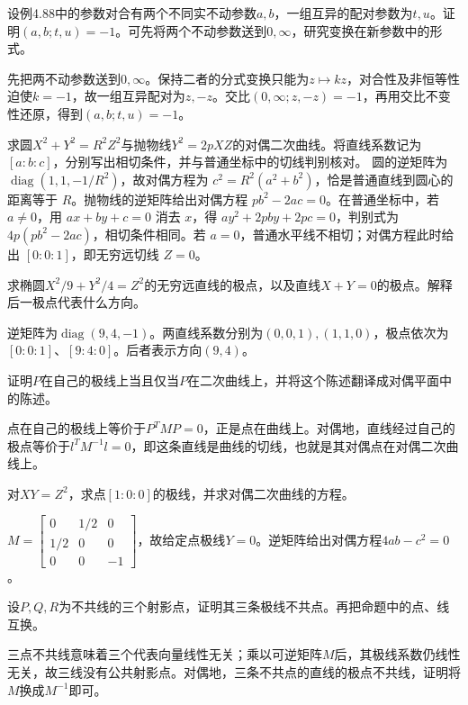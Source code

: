设例4.88中的参数对合有两个不同实不动参数\(a,b\)，一组互异的配对参数为\(t,u\)。证明\((a,b;t,u)=-1\)。可先将两个不动参数送到\(0,\infty\)，研究变换在新参数中的形式。
\par
\solutionanswer
先把两不动参数送到\(0,\infty\)。保持二者的分式变换只能为\(z\mapsto kz\)，对合性及非恒等性迫使\(k=-1\)，故一组互异配对为\(z,-z\)。交比\((0,\infty;z,-z)=-1\)，再用交比不变性还原，得到\((a,b;t,u)=-1\)。


求圆\(X^2+Y^2=R^2Z^2\)与抛物线\(Y^2=2pXZ\)的对偶二次曲线。将直线系数记为\([a:b:c]\)，分别写出相切条件，并与普通坐标中的切线判别核对。
\solutionanswer
圆的逆矩阵为 \(\operatorname{diag}(1,1,-1/R^2)\)，故对偶方程为 \(c^2=R^2(a^2+b^2)\)，恰是普通直线到圆心的距离等于 \(R\)。抛物线的逆矩阵给出对偶方程 \(pb^2-2ac=0\)。在普通坐标中，若 \(a\ne0\)，用 \(ax+by+c=0\) 消去 \(x\)，得 \(ay^2+2pby+2pc=0\)，判别式为 \(4p(pb^2-2ac)\)，相切条件相同。若 \(a=0\)，普通水平线不相切；对偶方程此时给出 \([0:0:1]\)，即无穷远切线 \(Z=0\)。


求椭圆\(X^2/9+Y^2/4=Z^2\)的无穷远直线的极点，以及直线\(X+Y=0\)的极点。解释后一极点代表什么方向。
\par
\solutionanswer
逆矩阵为\(\operatorname{diag}(9,4,-1)\)。两直线系数分别为\((0,0,1),(1,1,0)\)，极点依次为\([0:0:1]\)、\([9:4:0]\)。后者表示方向\((9,4)\)。


证明\(P\)在自己的极线上当且仅当\(P\)在二次曲线上，并将这个陈述翻译成对偶平面中的陈述。
\par
\solutionanswer
点在自己的极线上等价于\(P^TMP=0\)，正是点在曲线上。对偶地，直线经过自己的极点等价于\(l^TM^{-1}l=0\)，即这条直线是曲线的切线，也就是其对偶点在对偶二次曲线上。


对\(XY=Z^2\)，求点\([1:0:0]\)的极线，并求对偶二次曲线的方程。
\par
\solutionanswer
\(M=\begin{bmatrix}0&1/2&0\\1/2&0&0\\0&0&-1\end{bmatrix}\)，故给定点极线\(Y=0\)。逆矩阵给出对偶方程\(4ab-c^2=0\)。


设\(P,Q,R\)为不共线的三个射影点，证明其三条极线不共点。再把命题中的点、线互换。
\par
\solutionanswer
三点不共线意味着三个代表向量线性无关；乘以可逆矩阵\(M\)后，其极线系数仍线性无关，故三线没有公共射影点。对偶地，三条不共点的直线的极点不共线，证明将\(M\)换成\(M^{-1}\)即可。



